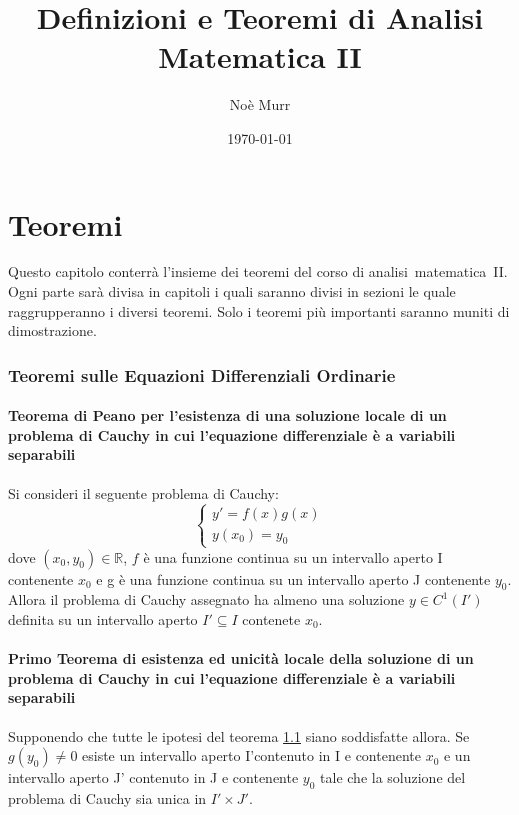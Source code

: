 \documentclass{article}
\title{Definizioni e Teoremi di Analisi Matematica II}
\author{Noè Murr}
\date{\today}
\begin{document}
	\maketitle
	\newpage
	\tableofcontents
	\newpage
	
	\part*{Teoremi}
		Questo capitolo conterrà l'insieme dei teoremi del corso di \mbox{analisi matematica II}. 
		Ogni parte sarà divisa in capitoli i quali saranno divisi in sezioni le quale raggrupperanno i diversi teoremi. 
		Solo i teoremi più importanti saranno muniti di dimostrazione.
		
		\section{Teoremi sulle Equazioni Differenziali Ordinarie}
		
			\subsection{Teorema di Peano per l'esistenza di una soluzione locale di un problema di Cauchy in cui l'equazione differenziale è a variabili separabili} \label{t1}
			
				Si consideri il seguente problema di Cauchy:
				\begin{equation}
					\begin{cases} 
						y' = f(x)g(x) \\
						y(x_0) = y_0
					 \end{cases}
				\end{equation}
				dove $(x_0, y_0) \in \mathbb{R}$, $f$ è una funzione continua su un intervallo aperto I contenente $x_0$ e g è una funzione continua su un intervallo aperto J contenente $y_0$. Allora il problema di Cauchy assegnato ha almeno una soluzione $y \in C^1(I')$ definita su un intervallo aperto $I' \subseteq I$ contenete $x_0$.				
			
			\subsection{Primo Teorema di esistenza ed unicità locale della soluzione di un problema di Cauchy in cui l'equazione differenziale è a variabili separabili} \label{t2}
			
				Supponendo che tutte le ipotesi del teorema \ref{t1} siano soddisfatte allora. Se $g(y_0) \neq 0$  esiste un intervallo aperto I'contenuto in I e contenente $x_0$ e un intervallo aperto J' contenuto in J e contenente $y_0$ tale che la soluzione del problema di Cauchy sia unica in $I' \times J'$.
				
\end{document}
